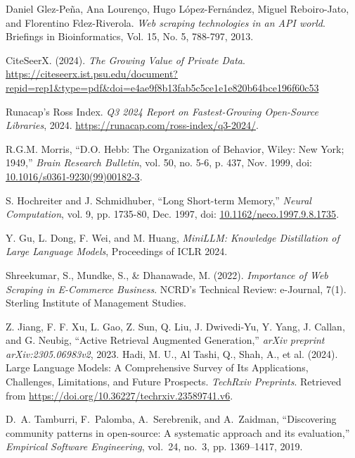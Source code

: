 \documentclass[english,master]{unibg}
\begin{document}
\begin{thebibliography}{1}
Daniel Glez-Peña, Ana Lourenço, Hugo López-Fernández, Miguel Reboiro-Jato, and Florentino Fdez-Riverola. 
\textit{Web scraping technologies in an API world}. Briefings in Bioinformatics, Vol. 15, No. 5, 788-797, 2013.

CiteSeerX. (2024). \textit{The Growing Value of Private Data}. \url{https://citeseerx.ist.psu.edu/document?repid=rep1&type=pdf&doi=e4ae9f8b13fab5c5ce1e1e820b64bce196f60c53}

Runacap's Ross Index. \emph{Q3 2024 Report on Fastest-Growing Open-Source Libraries}, 2024. \url{https://runacap.com/ross-index/q3-2024/}.


R.G.M. Morris, ``D.O. Hebb: The Organization of Behavior, Wiley: New York; 1949,'' \textit{Brain Research Bulletin}, vol. 50, no. 5-6, p. 437, Nov. 1999, doi: \href{https://doi.org/10.1016/s0361-9230(99)00182-3}{10.1016/s0361-9230(99)00182-3}.

S. Hochreiter and J. Schmidhuber, ``Long Short-term Memory,'' \textit{Neural Computation}, vol. 9, pp. 1735-80, Dec. 1997, doi: \href{https://doi.org/10.1162/neco.1997.9.8.1735}{10.1162/neco.1997.9.8.1735}.

Y. Gu, L. Dong, F. Wei, and M. Huang, 
\textit{MiniLLM: Knowledge Distillation of Large Language Models}, 
Proceedings of ICLR 2024.
    
Shreekumar, S., Mundke, S., \& Dhanawade, M. (2022). \textit{Importance of Web Scraping in E-Commerce Business}. NCRD’s Technical Review: e-Journal, 7(1). Sterling Institute of Management Studies.


    Z. Jiang, F. F. Xu, L. Gao, Z. Sun, Q. Liu, J. Dwivedi-Yu, Y. Yang, J. Callan, and G. Neubig, ``Active Retrieval Augmented Generation,'' \emph{arXiv preprint arXiv:2305.06983v2}, 2023.
Hadi, M. U., Al Tashi, Q., Shah, A., et al. (2024). Large Language Models: A Comprehensive Survey of Its Applications, Challenges, Limitations, and Future Prospects. \textit{TechRxiv Preprints}. Retrieved from \url{https://doi.org/10.36227/techrxiv.23589741.v6}.




D.~A. Tamburri, F.~Palomba, A.~Serebrenik, and A.~Zaidman, ``Discovering community patterns in open-source: A systematic approach and its evaluation,'' \emph{Empirical Software Engineering}, vol.~24, no.~3, pp. 1369–1417, 2019.


\end{thebibliography}
\end{document}
